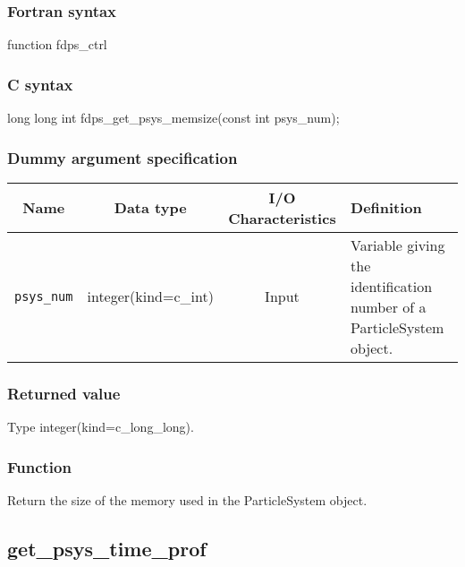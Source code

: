 \subsubsection*{Fortran syntax}
\begin{screen}
\begin{spverbatim}
function fdps_ctrl%
\end{spverbatim}
\end{screen}

\subsubsection*{C syntax}
\begin{screen}
\begin{spverbatim}
long long int fdps_get_psys_memsize(const int psys_num);
\end{spverbatim}
\end{screen}

\subsubsection*{Dummy argument specification}
\begin{table}[h]
\begin{tabularx}{\linewidth}{cccX}
\toprule
\rowcolor{Snow2}
Name & Data type & I/O Characteristics & Definition \\        
\midrule
\texttt{psys\_num} & integer(kind=c\_int) & Input & Variable giving the identification number of a ParticleSystem object.\\
\bottomrule
\end{tabularx}
\end{table}

\subsubsection*{Returned value}
Type integer(kind=c\_long\_long).

\subsubsection*{Function}
Return the size of the memory used in the ParticleSystem object.

\clearpage

\subsection{get\_psys\_time\_prof}
